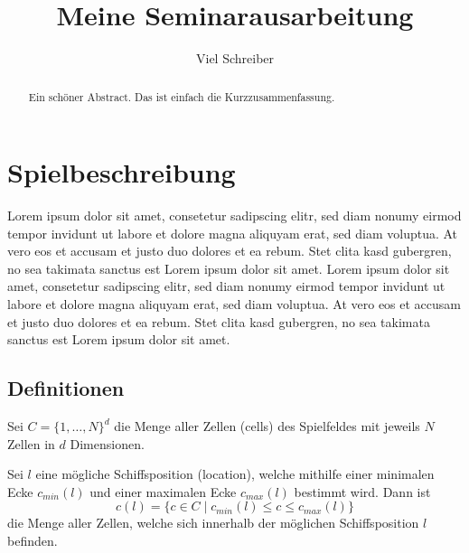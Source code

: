 \documentclass[a4paper,12pt]{llncs}
\numberwithin{equation}{section}
\begin{document}


\author{Viel Schreiber}

\title{Meine Seminarausarbeitung}

\maketitle

\thispagestyle{empty}

\begin{abstract}
Ein schöner Abstract. Das ist einfach die Kurzzusammenfassung.
\end{abstract}

\section{Spielbeschreibung}
Lorem ipsum dolor sit amet, consetetur sadipscing elitr, sed diam nonumy eirmod tempor invidunt ut labore et dolore magna aliquyam erat, sed diam voluptua. At vero eos et accusam et justo duo dolores et ea rebum. Stet clita kasd gubergren, no sea takimata sanctus est Lorem ipsum dolor sit amet. Lorem ipsum dolor sit amet, consetetur sadipscing elitr, sed diam nonumy eirmod tempor invidunt ut labore et dolore magna aliquyam erat, sed diam voluptua. At vero eos et accusam et justo duo dolores et ea rebum. Stet clita kasd gubergren, no sea takimata sanctus est Lorem ipsum dolor sit amet.

\subsection{Definitionen}
Sei $C=\{1, \dots, N\}^d$ die Menge aller Zellen (cells) des Spielfeldes mit jeweils $N$ Zellen in $d$ Dimensionen.

Sei $l$ eine mögliche Schiffsposition (location), welche mithilfe einer minimalen Ecke $c_{min}(l)$ und einer maximalen Ecke $c_{max}(l)$ bestimmt wird. Dann ist
\[
c(l)=
\{
c
\in
C
\mid
c_{min}(l) \leq c \leq c_{max}(l)
\}
\]
die Menge aller Zellen, welche sich innerhalb der möglichen Schiffsposition $l$ befinden.
\end{document}
